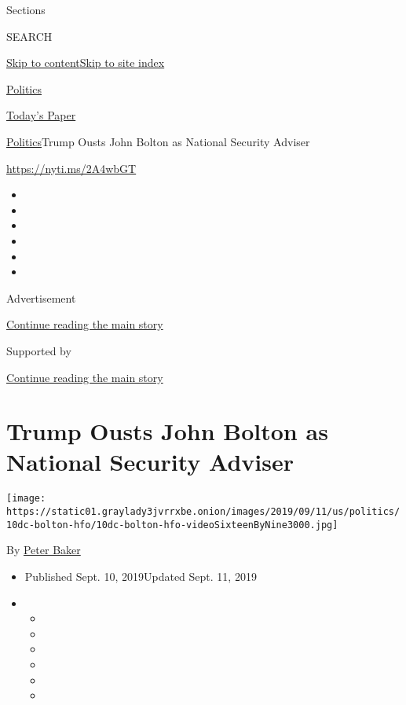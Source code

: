 Sections

SEARCH

\protect\hyperlink{site-content}{Skip to
content}\protect\hyperlink{site-index}{Skip to site index}

\href{https://www.nytimes3xbfgragh.onion/section/politics}{Politics}

\href{https://myaccount.nytimes3xbfgragh.onion/auth/login?response_type=cookie\&client_id=vi}{}

\href{https://www.nytimes3xbfgragh.onion/section/todayspaper}{Today's
Paper}

\href{/section/politics}{Politics}\textbar{}Trump Ousts John Bolton as
National Security Adviser

\url{https://nyti.ms/2A4wbGT}

\begin{itemize}
\item
\item
\item
\item
\item
\item
\end{itemize}

Advertisement

\protect\hyperlink{after-top}{Continue reading the main story}

Supported by

\protect\hyperlink{after-sponsor}{Continue reading the main story}

\hypertarget{trump-ousts-john-bolton-as-national-security-adviser}{%
\section{Trump Ousts John Bolton as National Security
Adviser}\label{trump-ousts-john-bolton-as-national-security-adviser}}

\texttt{[image: https://static01.graylady3jvrrxbe.onion/images/2019/09/11/us/politics/10dc-bolton-hfo/10dc-bolton-hfo-videoSixteenByNine3000.jpg]}

By \href{https://www.nytimes3xbfgragh.onion/by/peter-baker}{Peter Baker}

\begin{itemize}
\item
  Published Sept. 10, 2019Updated Sept. 11, 2019
\item
  \begin{itemize}
  \item
  \item
  \item
  \item
  \item
  \item
  \end{itemize}
\end{itemize}


